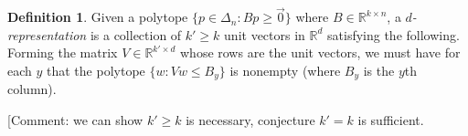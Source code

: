\documentclass[12pt]{article}
\theoremstyle{definition}
\newtheorem{definition}{Definition}
\newcommand{\reals}{\mathbb{R}}
\begin{document}
\begin{definition}
  Given a polytope $\{p \in \Delta_n : B p \geq \vec{0}\}$ where $B \in \reals^{k \times n}$, a \emph{$d$-representation} is a collection of $k' \geq k$ unit vectors in $\reals^d$ satisfying the following.
  Forming the matrix $V \in \reals^{k' \times d}$ whose rows are the unit vectors, we must have for each $y$ that the polytope $\{ w : Vw \leq B_y \}$ is nonempty (where $B_y$ is the $y$th column).
\end{definition}
[Comment: we can show $k' \geq k$ is necessary, conjecture $k'=k$ is sufficient.

\end{document}
